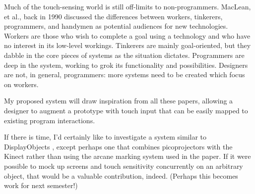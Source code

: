 \documentclass[11pt]{article}
\begin{document}
Much of the touch-sensing world is still off-limits to non-programmers.  MacLean, et al., \cite{USER-TAILORABLE} back in 1990 discussed the differences between workers, tinkerers, programmers, and handymen as potential audiences for new technologies.  Workers are those who wish to complete a goal using a technology and who have no interest in its low-level workings.  Tinkerers are mainly goal-oriented, but they dabble in the core pieces of systems as the situation dictates.  Programmers are deep in the system, working to grok its functionality and possibilities.  Designers are not, in general, programmers: more systems need to be created which focus on workers.

My proposed system will draw inspiration from all these papers, allowing a designer to augment a prototype with touch input that can be easily mapped to existing program interactions.

If there is time, I'd certainly like to investigate a system similar to DisplayObjects \cite{DISPLAYOBJECTS}, except perhaps one that combines picoprojectors with the Kinect rather than using the arcane marking system used in the paper.  If it were possible to mock up screens and touch sensitivity concurrently on an arbitrary object, that would be a valuable contribution, indeed.  (Perhaps this becomes work for next semester!)

{}

\end{document}
